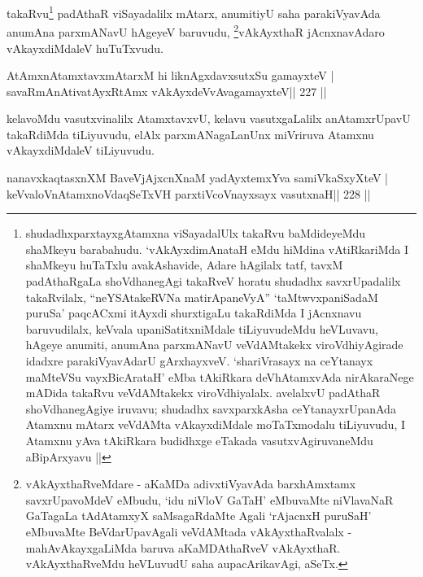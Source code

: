 \begin{artha}
takaRvu\footnote{shudadhxparxtayxgAtamxna viSayadalUlx takaRvu baMdideyeMdu shaMkeyu barabahudu. `vAkAyxdimAnataH eMdu hiMdina vAtiRkariMda I shaMkeyu huTaTxlu avakAshavide, Adare hAgilalx tatf, tavxM padAthaRgaLa shoVdhanegAgi takaRveV horatu shudadhx savxrUpadalilx takaRvilalx, ``neYSAtakeRVNa matirApaneVyA'' `taMtwvxpaniSadaM puruSa' paqcACxmi itAyxdi shurxtigaLu takaRdiMda I jAcnxnavu baruvudilalx, keVvala upaniSatitxniMdale tiLiyuvudeMdu heVLuvavu, hAgeye anumiti, anumAna parxmANavU veVdAMtakekx viroVdhiyAgirade idadxre parakiVyavAdarU gArxhayxveV. `shariVrasayx na ceYtanayx maMteVSu vayxBicArataH' eMba tAkiRkara deVhAtamxvAda nirAkaraNege mADida takaRvu veVdAMtakekx viroVdhiyalalx. avelalxvU padAthaR shoVdhanegAgiye iruvavu; shudadhx savxparxkAsha ceYtanayxrUpanAda Atamxnu mAtarx veVdAMta vAkayxdiMdale moTaTxmodalu tiLiyuvudu, I Atamxnu yAva tAkiRkara budidhxge eTakada vasutxvAgiruvaneMdu aBipArxyavu ||} padAthaR viSayadalilx mAtarx, anumitiyU saha parakiVyavAda anumAna parxmANavU hAgeyeV baruvudu, \footnote{vAkAyxthaRveMdare - aKaMDa adivxtiVyavAda barxhAmxtamx savxrUpavoMdeV eMbudu, `idu niVloV GaTaH' eMbuvaMte niVlavaNaR GaTagaLa tAdAtamxyX saMsagaRdaMte Agali `rAjacnxH puruSaH' eMbuvaMte BeVdarUpavAgali veVdAMtada vAkAyxthaRvalalx - mahAvAkayxgaLiMda baruva aKaMDAthaRveV vAkAyxthaR. vAkAyxthaRveMdu heVLuvudU saha aupacArikavAgi, aSeTx.}vAkAyxthaR jAcnxnavAdaro vAkayxdiMdaleV huTuTxvudu.
\end{artha}


\begin{shl}
AtAmxnAtamxtavxmAtarxM hi liknAgxdavxsutxSu gamayxteV |
savaRmAnAtivatAyxRtAmx vAkAyxdeVvAvagamayxteV\hfill || 227 ||
\end{shl}

\begin{artha}
kelavoMdu vasutxvinalilx AtamxtavxvU, kelavu vasutxgaLalilx anAtamxrUpavU takaRdiMda tiLiyuvudu, elAlx parxmANagaLanUnx miVriruva Atamxnu vAkayxdiMdaleV tiLiyuvudu.
\end{artha}


\begin{shl}
nanavxkaqtasxnXM BaveVjAjxcnXnaM yadAyxtemxYva samiVkaSxyXteV |
keVvaloV\s nAtamxnoV\s daqSeTxVH parxtiVcoV\s nayxsayx vasutxnaH\hfill || 228 ||
\end{shl}

